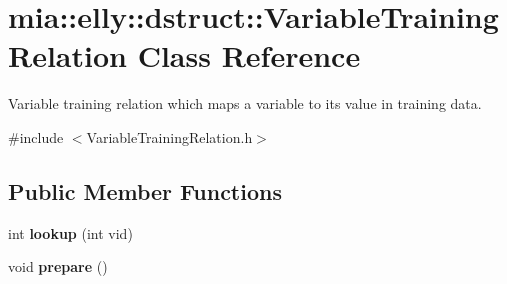 \hypertarget{classmia_1_1elly_1_1dstruct_1_1_variable_training_relation}{\section{mia\-:\-:elly\-:\-:dstruct\-:\-:Variable\-Training\-Relation Class Reference}
\label{classmia_1_1elly_1_1dstruct_1_1_variable_training_relation}
}


Variable training relation which maps a variable to its value in training data.  




{\ttfamily \#include $<$Variable\-Training\-Relation.\-h$>$}

\subsection*{Public Member Functions}
\begin{DoxyCompactItemize}
\item 
\hypertarget{classmia_1_1elly_1_1dstruct_1_1_variable_training_relation_a9cb4f20019182911637db8a593a85fbd}{int {\bfseries lookup} (int vid)}\label{classmia_1_1elly_1_1dstruct_1_1_variable_training_relation_a9cb4f20019182911637db8a593a85fbd}

\item 
\hypertarget{classmia_1_1elly_1_1dstruct_1_1_variable_training_relation_ac77cbc07585f81a6e02a49bb56baeba7}{void {\bfseries prepare} ()}\label{classmia_1_1elly_1_1dstruct_1_1_variable_training_relation_ac77cbc07585f81a6e02a49bb56baeba7}

\end{DoxyCompactItemize}
